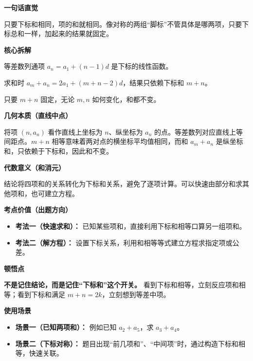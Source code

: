 \begin{explanationbox}
\textbf{\textcolor{CExplanation}{一句话直觉}}

只要下标和相同，项的和就相同。像对称的两组“脚标”不管具体是哪两项，只要下标总和一样，加起来的结果就固定。

\medskip
\textbf{\textcolor{CExplanation}{核心拆解}}
\begin{description}[style=nextline, leftmargin=2.8em, labelsep=0.5em, itemsep=0.45em]
    \item[\textbf{要点一（通项线性）：}] 等差数列通项 $a_n = a_1 + (n-1)d$ 是下标的线性函数。
    \item[\textbf{要点二（和消去 d）：}] 求和时 $a_m+a_n = 2a_1 + (m+n-2)d$，结果只依赖下标和 $m+n$。
    \item[\textbf{要点三（下标捆绑）：}] 只要 $m+n$ 固定，无论 $m,n$ 如何变化，和都不变。
\end{description}

\medskip
\textbf{\textcolor{CExplanation}{几何本质（直线中点）}}

将项 $(n, a_n)$ 看作直线上坐标为 $n$、纵坐标为 $a_n$ 的点。等差数列对应直线上等间距点。$m+n$ 相等意味着两对点的横坐标平均值相同，而和 $a_m+a_n$ 是纵坐标和，只依赖于下标和，因此和不变。

\medskip
\textbf{\textcolor{CExplanation}{代数意义（和消元）}}

结论将四项和的关系转化为下标和关系，避免了逐项计算。可以快速由部分和求其他项和，也可建立方程。

\medskip
\textbf{\textcolor{CExplanation}{考点价值（出题方向）}}
\begin{itemize}[leftmargin=*, itemsep=0.5em, topsep=0.4em]
    \item \textbf{考法一（快速求和）：} 已知某些项和，直接利用下标和相等口算另一组项和。
    \item \textbf{考法二（解方程）：} 设置下标关系，利用和相等等式建立方程求指定项或公差。
\end{itemize}

\medskip
\textbf{\textcolor{CExplanation}{顿悟点}}

\textbf{不是记住结论，而是记住“下标和”这个开关。} 看到下标和相等，立刻反应项和相等；看到下标和满足 $m+n=2k$，立刻想到等差中项。

\medskip
\textbf{\textcolor{CExplanation}{使用场景}}
\begin{itemize}[leftmargin=*, itemsep=0.5em, topsep=0.4em]
    \item \textbf{场景一（已知两项和）：} 例如已知 $a_2+a_5$，求 $a_3+a_4$。
    \item \textbf{场景二（下标对称）：} 题目出现“前几项和”、“中间项”时，通过构造下标和相等，快速关联。
\end{itemize}
\end{explanationbox}
